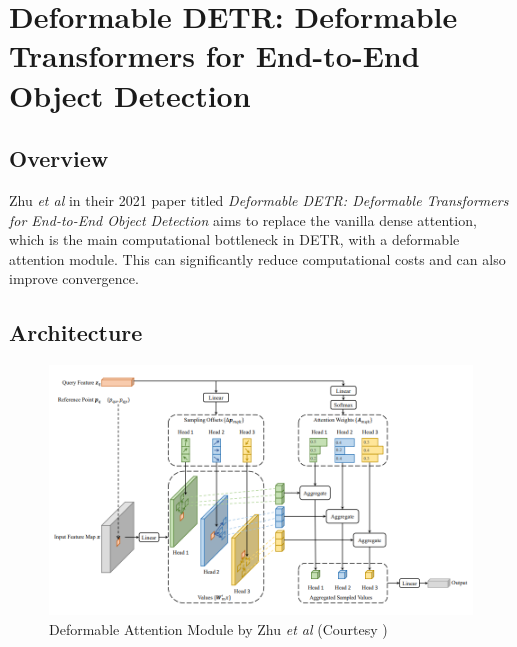 \section{Deformable DETR: Deformable Transformers for End-to-End Object Detection}

\label{appendix:deformable-detr-paper}

\subsection{Overview}

\par Zhu \textit{et al} in their 2021 paper titled \textit{Deformable DETR: Deformable Transformers for End-to-End Object Detection} aims to replace the vanilla dense attention, which is the main computational bottleneck in DETR, with a deformable attention module. This can significantly reduce computational costs and can also improve convergence.
\par

\subsection{Architecture}
\begin{figure}[h]
	\centering
	\includegraphics[width=\linewidth]{assets/img/deformable-attention-module.png}
	\caption{Deformable Attention Module by Zhu
		\textit{et al} (Courtesy \cite{zhu2020deformable})}
\end{figure}

